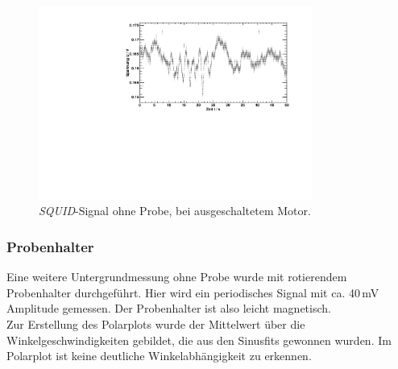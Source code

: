 \begin{figure}[H]
\begin{center}
  \includegraphics[width=0.8\textwidth]{../img/Untergrund.pdf}
  \caption{\emph{SQUID}-Signal ohne Probe, bei ausgeschaltetem Motor.}
  \label{img:underground}
\end{center}
\end{figure}



\subsubsection{Probenhalter}
Eine weitere Untergrundmessung ohne Probe wurde mit rotierendem Probenhalter durchgeführt.
Hier wird ein periodisches Signal mit ca. 40\,mV Amplitude gemessen.
Der Probenhalter ist also leicht magnetisch.\\
Zur Erstellung des Polarplots wurde der Mittelwert über die Winkelgeschwindigkeiten gebildet,
die aus den Sinusfits gewonnen wurden.
Im Polarplot ist keine deutliche Winkelabhängigkeit zu erkennen.



